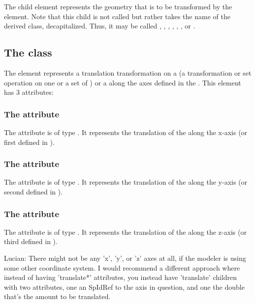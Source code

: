 The child  element represents the geometry that is to be transformed by the \CSGTransformation element.  Note that this child is not called  but rather takes the name of the derived class, decapitalized.  Thus, it may be called , , , , , , or .


\subsection{The  class}
\label{CSGTranslation-class}
The \CSGTranslation element represents a translation transformation on a \CSGNode (a transformation or set operation on one or a set of \CSGPrimitives) or a \CSGPrimitive along the axes defined in the \Geometry. This element has 3 attributes:

\subsubsection{The  attribute}
The  attribute is of type . It represents the translation of the \CSGNode along the x-axis (or first \CoordinateComponent defined in \Geometry).

\subsubsection{The  attribute}
The  attribute is of type . It represents the translation of the \CSGNode along the y-axis (or second \CoordinateComponent defined in \Geometry).

\subsubsection{The  attribute}
The  attribute is of type . It represents the translation of the \CSGNode along the z-axis (or third \CoordinateComponent defined in \Geometry).

{\color{red} Lucian: \notice There might not be any 'x', 'y', or 'z' axes at all, if the modeler is using some other coordinate system.  I would recommend a different approach where instead of having 'translate*' attributes, you instead have 'translate' children with two attributes, one an SpIdRef to the axis in question, and one the double that's the amount to be translated.}

